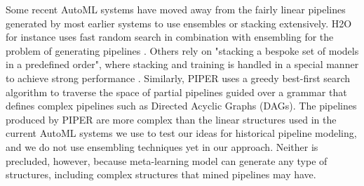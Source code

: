 Some recent AutoML systems have moved away from the fairly linear pipelines generated by most earlier systems to use ensembles or stacking extensively.  H2O for instance uses fast random search in combination with ensembling for the problem of generating pipelines \cite{LeDell2020H2OAS}.  Others rely on "stacking a bespoke set of models in a predefined order", where stacking and training is handled in a special manner to achieve strong performance \cite{erickson2020autogluontabular}. Similarly, PIPER \cite{piper} uses a greedy best-first search algorithm to traverse the space of partial pipelines guided over a grammar that defines complex pipelines such as Directed Acyclic Graphs (DAGs).  The pipelines produced by PIPER are more complex than the linear structures used in the current AutoML systems we use to test our ideas for historical pipeline modeling, and we do not use ensembling techniques yet in our approach.
Neither is precluded, however, because {\sysname} meta-learning model can generate any type of structures, including complex structures that mined pipelines may have. 







